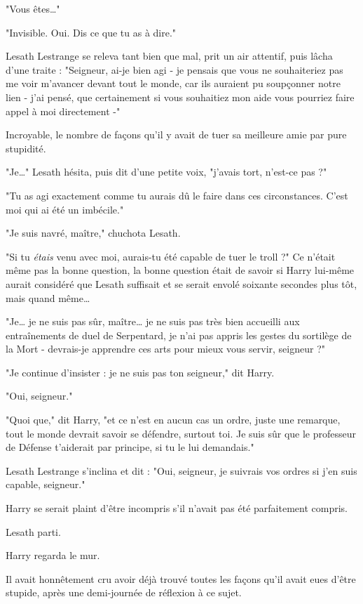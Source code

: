 "Vous êtes…"

"Invisible. Oui. Dis ce que tu as à dire."

Lesath Lestrange se releva tant bien que mal, prit un air attentif, puis lâcha d'une traite : "Seigneur, ai-je bien agi - je pensais que vous ne souhaiteriez pas me voir m'avancer devant tout le monde, car ils auraient pu soupçonner notre lien - j'ai pensé, que certainement si vous souhaitiez mon aide vous pourriez faire appel à moi directement -"

Incroyable, le nombre de façons qu'il y avait de tuer sa meilleure amie par pure stupidité.

"Je…" Lesath hésita, puis dit d'une petite voix, "j'avais tort, n'est-ce pas ?"

"Tu as agi exactement comme tu aurais dû le faire dans ces circonstances. C'est moi qui ai été un imbécile."

"Je suis navré, maître," chuchota Lesath.

"Si tu \emph{étais}  venu avec moi, aurais-tu été capable de tuer le troll ?" Ce n'était même pas la bonne question, la bonne question était de savoir si Harry lui-même aurait considéré que Lesath suffisait et se serait envolé soixante secondes plus tôt, mais quand même…

"Je… je ne suis pas sûr, maître… je ne suis pas très bien accueilli aux entraînements de duel de Serpentard, je n'ai pas appris les gestes du sortilège de la Mort - devrais-je apprendre ces arts pour mieux vous servir, seigneur ?"

"Je continue d'insister : je ne suis pas ton seigneur," dit Harry.

"Oui, seigneur."

"Quoi que," dit Harry, "et ce n'est en aucun cas un ordre, juste une remarque, tout le monde devrait savoir se défendre, surtout toi. Je suis sûr que le professeur de Défense t'aiderait par principe, si tu le lui demandais."

Lesath Lestrange s'inclina et dit : "Oui, seigneur, je suivrais vos ordres si j'en suis capable, seigneur."

Harry se serait plaint d'être incompris s'il n'avait pas été parfaitement compris.

Lesath parti.

Harry regarda le mur.

Il avait honnêtement cru avoir déjà trouvé toutes les façons qu'il avait eues d'être stupide, après une demi-journée de réflexion à ce sujet.

